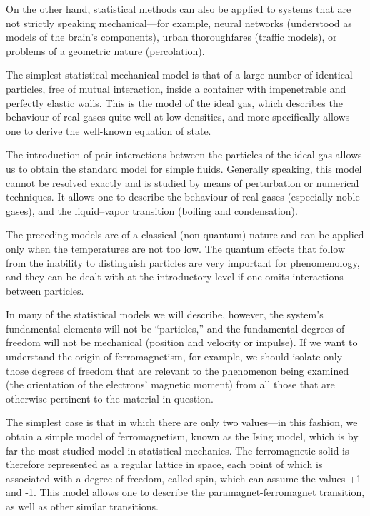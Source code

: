 \documentclass[11pt, a4paper, twoside, openright]{book}
\begin{document}
On the other hand, statistical methods can also be applied to systems that are not strictly speaking mechanical—for example, neural networks (understood as models of the brain’s components), urban thoroughfares (traffic models), or problems of a geometric nature (percolation).

The simplest statistical mechanical model is that of a large number of identical particles, free of mutual interaction, inside a container with impenetrable and perfectly elastic walls. This is the model of the ideal gas, which describes the behaviour of real gases quite well at low densities, and more specifically allows one to derive the well-known equation of state.

The introduction of pair interactions between the particles of the ideal gas allows us to obtain the standard model for simple fluids. Generally speaking, this model cannot be resolved exactly and is studied by means of perturbation or numerical techniques. It allows one to describe the behaviour of real gases (especially noble gases), and the liquid–vapor transition (boiling and condensation).

The preceding models are of a classical (non-quantum) nature and can be applied only when the temperatures are not too low. The quantum effects that follow from the inability to distinguish particles are very important for phenomenology, and they can be dealt with at the introductory level if one omits interactions between particles. 

In many of the statistical models we will describe, however, the system's fundamental elements will not be “particles,” and the fundamental degrees of freedom will not be mechanical (position and velocity or impulse). If we want to understand the origin of ferromagnetism, for example, we should isolate only those degrees of freedom that are relevant to the phenomenon being examined (the orientation of the electrons’ magnetic moment) from all those that are otherwise pertinent to the material in question.

The simplest case is that in which there are only two values—in this fashion, we obtain a simple model of ferromagnetism, known as the Ising model, which is by far the most studied model in statistical mechanics. The ferromagnetic solid is therefore represented as a regular lattice in space, each point of which is associated with a degree of freedom, called spin, which can assume the values +1 and -1. This model allows one to describe the paramagnet-ferromagnet transition, as well as other similar transitions.
\end{document}
